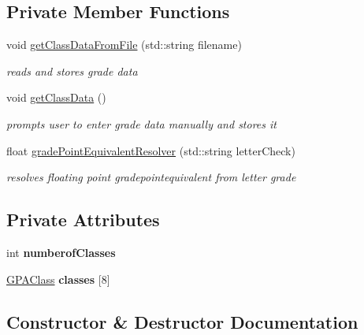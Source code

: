 \subsection*{Private Member Functions}
\begin{DoxyCompactItemize}
\item 
void \mbox{\hyperlink{class_g_p_a_calculator_a8d6b09c94e927a1aec8aa52b8d1cd171}{get\+Class\+Data\+From\+File}} (std\+::string filename)
\begin{DoxyCompactList}\small\item\em reads and stores grade data \end{DoxyCompactList}\item 
void \mbox{\hyperlink{class_g_p_a_calculator_a5f41df7247996cb6244548634ad4674c}{get\+Class\+Data}} ()
\begin{DoxyCompactList}\small\item\em prompts user to enter grade data manually and stores it \end{DoxyCompactList}\item 
float \mbox{\hyperlink{class_g_p_a_calculator_aab6e4bedfe1131f9a5d3984ca03720c1}{grade\+Point\+Equivalent\+Resolver}} (std\+::string letter\+Check)
\begin{DoxyCompactList}\small\item\em resolves floating point gradepointequivalent from letter grade \end{DoxyCompactList}\end{DoxyCompactItemize}
\subsection*{Private Attributes}
\begin{DoxyCompactItemize}
\item 
\mbox{\label{class_g_p_a_calculator_a234f561371f3d2518dd4901e73659017}} 
int {\bfseries numberof\+Classes}
\item 
\mbox{\label{class_g_p_a_calculator_a756737bab0686aa274db1c7b08a6b0cf}} 
\mbox{\hyperlink{class_g_p_a_class}{G\+P\+A\+Class}} {\bfseries classes} \mbox{[}8\mbox{]}
\end{DoxyCompactItemize}


\subsection{Constructor \& Destructor Documentation}
\mbox{\label{class_g_p_a_calculator_aa9b9dbb521f84cb1a5f48a89f11b453b}} 
